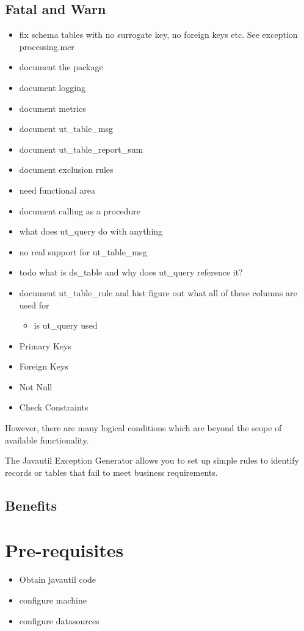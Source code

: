 \section{Fatal and Warn}
\begin{itemize} 
 \item fix schema tables with no surrogate key, no foreign keys etc. See exception processing.mer
 \item document the package
 \item document logging
 \item document metrics
 \item document ut_table_msg
 \item document ut_table_report_sum
 \item document exclusion rules
 \item need functional area
 \item document calling as a procedure
 \item what does ut_query do with anything
 \item no real support for ut_table_msg
  \item todo what is ds_table and why does ut_query reference it?
 \item document ut_table_rule and hist figure out what all of these columns are used for
 \begin{itemize}
  \item is ut_query used
 \end{itemize}

\end{itemize}

\begin{itemize}
 \item Primary Keys
 \item Foreign Keys
 \item Not Null
 \item Check Constraints
\end{itemize}
However, there are many logical conditions which are beyond the scope of available functionality.

The Javautil Exception Generator allows you to set up simple rules to identify records or tables that fail
to meet business requirements.

\section{Benefits}

\chapter{Pre-requisites}
\begin{itemize}
 \item Obtain javautil code
 \item configure machine
 \item configure datasources
\end{itemize}
